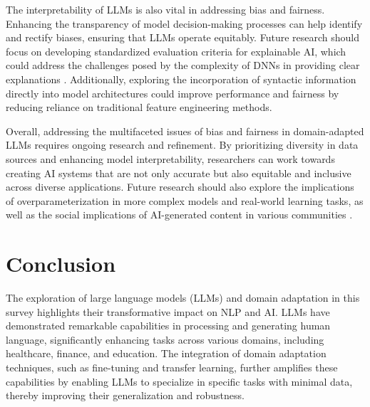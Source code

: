 The interpretability of LLMs is also vital in addressing bias and fairness. Enhancing the transparency of model decision-making processes can help identify and rectify biases, ensuring that LLMs operate equitably. Future research should focus on developing standardized evaluation criteria for explainable AI, which could address the challenges posed by the complexity of DNNs in providing clear explanations \cite{goldfarb2022analysiscatastrophicforgettingrandom}. Additionally, exploring the incorporation of syntactic information directly into model architectures could improve performance and fairness by reducing reliance on traditional feature engineering methods.



Overall, addressing the multifaceted issues of bias and fairness in domain-adapted LLMs requires ongoing research and refinement. By prioritizing diversity in data sources and enhancing model interpretability, researchers can work towards creating AI systems that are not only accurate but also equitable and inclusive across diverse applications. Future research should also explore the implications of overparameterization in more complex models and real-world learning tasks, as well as the social implications of AI-generated content in various communities \cite{mcguffie2020radicalizationrisksgpt3advanced}.











\section{Conclusion} \label{sec:Conclusion}





The exploration of large language models (LLMs) and domain adaptation in this survey highlights their transformative impact on NLP and AI. LLMs have demonstrated remarkable capabilities in processing and generating human language, significantly enhancing tasks across various domains, including healthcare, finance, and education. The integration of domain adaptation techniques, such as fine-tuning and transfer learning, further amplifies these capabilities by enabling LLMs to specialize in specific tasks with minimal data, thereby improving their generalization and robustness.



